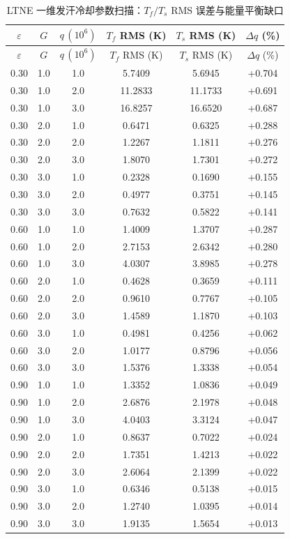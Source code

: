 \documentclass[11pt]{ctexart}
\begin{document}
\begin{longtable}{cccccc}
\caption{LTNE 一维发汗冷却参数扫描：$T_f/T_s$ RMS 误差与能量平衡缺口}\\
\toprule
$\varepsilon$ & $G$ & $q\,(10^6)$ & $T_f$ RMS (K) & $T_s$ RMS (K) & $\Delta q$ (\%) \\
\midrule
\endfirsthead
\toprule
$\varepsilon$ & $G$ & $q\,(10^6)$ & $T_f$ RMS (K) & $T_s$ RMS (K) & $\Delta q$ (\%) \\
\midrule
\endhead
0.30 & 1.0 & 1.0 & 5.7409 & 5.6945 & +0.704 \\
0.30 & 1.0 & 2.0 & 11.2833 & 11.1733 & +0.691 \\
0.30 & 1.0 & 3.0 & 16.8257 & 16.6520 & +0.687 \\
0.30 & 2.0 & 1.0 & 0.6471 & 0.6325 & +0.288 \\
0.30 & 2.0 & 2.0 & 1.2267 & 1.1811 & +0.276 \\
0.30 & 2.0 & 3.0 & 1.8070 & 1.7301 & +0.272 \\
0.30 & 3.0 & 1.0 & 0.2328 & 0.1690 & +0.155 \\
0.30 & 3.0 & 2.0 & 0.4977 & 0.3751 & +0.145 \\
0.30 & 3.0 & 3.0 & 0.7632 & 0.5822 & +0.141 \\
0.60 & 1.0 & 1.0 & 1.4009 & 1.3707 & +0.287 \\
0.60 & 1.0 & 2.0 & 2.7153 & 2.6342 & +0.280 \\
0.60 & 1.0 & 3.0 & 4.0307 & 3.8985 & +0.278 \\
0.60 & 2.0 & 1.0 & 0.4628 & 0.3659 & +0.111 \\
0.60 & 2.0 & 2.0 & 0.9610 & 0.7767 & +0.105 \\
0.60 & 2.0 & 3.0 & 1.4589 & 1.1870 & +0.103 \\
0.60 & 3.0 & 1.0 & 0.4981 & 0.4256 & +0.062 \\
0.60 & 3.0 & 2.0 & 1.0177 & 0.8796 & +0.056 \\
0.60 & 3.0 & 3.0 & 1.5376 & 1.3338 & +0.054 \\
0.90 & 1.0 & 1.0 & 1.3352 & 1.0836 & +0.049 \\
0.90 & 1.0 & 2.0 & 2.6876 & 2.1978 & +0.048 \\
0.90 & 1.0 & 3.0 & 4.0403 & 3.3124 & +0.047 \\
0.90 & 2.0 & 1.0 & 0.8637 & 0.7022 & +0.024 \\
0.90 & 2.0 & 2.0 & 1.7351 & 1.4213 & +0.022 \\
0.90 & 2.0 & 3.0 & 2.6064 & 2.1399 & +0.022 \\
0.90 & 3.0 & 1.0 & 0.6346 & 0.5138 & +0.015 \\
0.90 & 3.0 & 2.0 & 1.2740 & 1.0395 & +0.014 \\
0.90 & 3.0 & 3.0 & 1.9135 & 1.5654 & +0.013 \\
\bottomrule
\end{longtable}
\end{document}
